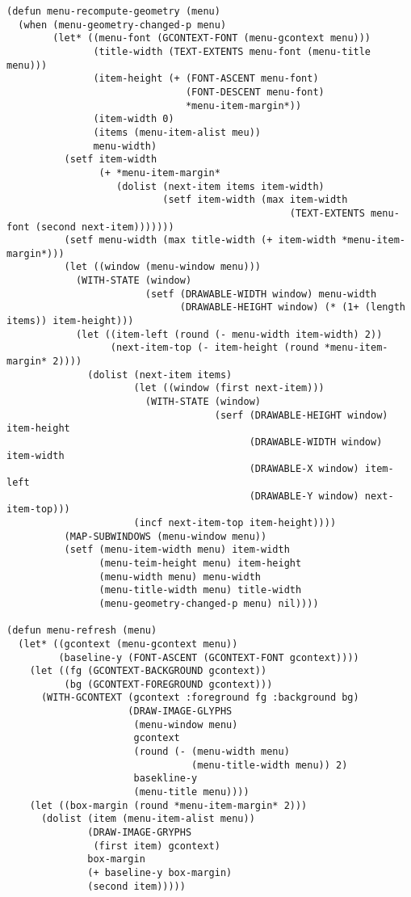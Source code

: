 {\begin{small}
\begin{verbatim}
(defun menu-recompute-geometry (menu)
  (when (menu-geometry-changed-p menu)
        (let* ((menu-font (GCONTEXT-FONT (menu-gcontext menu)))
               (title-width (TEXT-EXTENTS menu-font (menu-title menu)))
               (item-height (+ (FONT-ASCENT menu-font)
                               (FONT-DESCENT menu-font)
                               *menu-item-margin*))
               (item-width 0)
               (items (menu-item-alist meu))
               menu-width)
          (setf item-width
                (+ *menu-item-margin*
                   (dolist (next-item items item-width)
                           (setf item-width (max item-width
                                                 (TEXT-EXTENTS menu-font (second next-item)))))))
          (setf menu-width (max title-width (+ item-width *menu-item-margin*)))
          (let ((window (menu-window menu)))
            (WITH-STATE (window)
                        (setf (DRAWABLE-WIDTH window) menu-width
                              (DRAWABLE-HEIGHT window) (* (1+ (length items)) item-height)))
            (let ((item-left (round (- menu-width item-width) 2))
                  (next-item-top (- item-height (round *menu-item-margin* 2))))
              (dolist (next-item items)
                      (let ((window (first next-item)))
                        (WITH-STATE (window)
                                    (serf (DRAWABLE-HEIGHT window) item-height
                                          (DRAWABLE-WIDTH window) item-width
                                          (DRAWABLE-X window) item-left
                                          (DRAWABLE-Y window) next-item-top)))
                      (incf next-item-top item-height))))
          (MAP-SUBWINDOWS (menu-window menu))
          (setf (menu-item-width menu) item-width
                (menu-teim-height menu) item-height
                (menu-width menu) menu-width
                (menu-title-width menu) title-width
                (menu-geometry-changed-p menu) nil))))

(defun menu-refresh (menu)
  (let* ((gcontext (menu-gcontext menu))
         (baseline-y (FONT-ASCENT (GCONTEXT-FONT gcontext))))
    (let ((fg (GCONTEXT-BACKGROUND gcontext))
          (bg (GCONTEXT-FOREGROUND gcontext)))
      (WITH-GCONTEXT (gcontext :foreground fg :background bg)
                     (DRAW-IMAGE-GLYPHS
                      (menu-window menu)
                      gcontext
                      (round (- (menu-width menu)
                                (menu-title-width menu)) 2)
                      basekline-y
                      (menu-title menu))))
    (let ((box-margin (round *menu-item-margin* 2)))
      (dolist (item (menu-item-alist menu))
              (DRAW-IMAGE-GRYPHS
               (first item) gcontext)
              box-margin
              (+ baseline-y box-margin)
              (second item)))))


\end{verbatim}
\end{small}}
